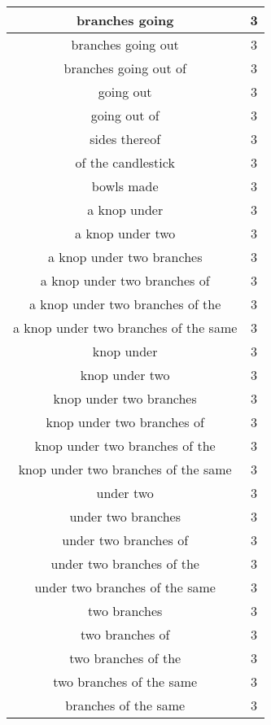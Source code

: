 \begin{center}
\begin{longtable}{|c|c|}
branches going & 3\\ \hline 
branches going out & 3\\ \hline 
branches going out of & 3\\ \hline 
going out & 3\\ \hline 
going out of & 3\\ \hline 
sides thereof & 3\\ \hline 
of the candlestick & 3\\ \hline 
bowls made & 3\\ \hline 
a knop under & 3\\ \hline 
a knop under two & 3\\ \hline 
a knop under two branches & 3\\ \hline 
a knop under two branches of & 3\\ \hline 
a knop under two branches of the & 3\\ \hline 
a knop under two branches of the same & 3\\ \hline 
knop under & 3\\ \hline 
knop under two & 3\\ \hline 
knop under two branches & 3\\ \hline 
knop under two branches of & 3\\ \hline 
knop under two branches of the & 3\\ \hline 
knop under two branches of the same & 3\\ \hline 
under two & 3\\ \hline 
under two branches & 3\\ \hline 
under two branches of & 3\\ \hline 
under two branches of the & 3\\ \hline 
under two branches of the same & 3\\ \hline 
two branches & 3\\ \hline 
two branches of & 3\\ \hline 
two branches of the & 3\\ \hline 
two branches of the same & 3\\ \hline 
branches of the same & 3\\ \hline 
\end{longtable}
\end{center}






